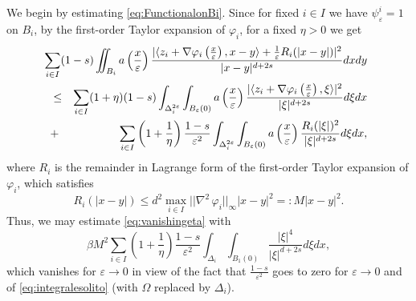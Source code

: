 \documentclass[11pt,a4paper,reqno]{amsart}
\theoremstyle{plain}
\theoremstyle{definition}
\newcommand\e{\varepsilon}
\newcommand\be{\begin{equation}}
\newcommand\ee{\end{equation}}
\newcommand\Omid{\Delta_i^{2\varepsilon}}
\theoremstyle{remark}
\begin{document}
We begin by estimating \eqref{eq:FunctionalonBi}. Since for fixed $i\in I$ we have $\psi_\e^i=1$ on $B_i$, by the first-order Taylor expansion of $\varphi_i$, for a fixed $\eta>0$ we get
\begin{eqnarray}\nonumber
   && \hskip-2.5cm  \sum_{i\in I}(1-s)\iint_{B_i}a\left(\frac{x}{\e}\right)\frac{|\langle z_i + \nabla{\varphi}_i\left(\frac{x}{\e}\right),x-y\rangle+\frac{1}{\e}R_i(|x-y|)\rvert^2}{\lvert x-y\rvert^{d+2s}}dxdy\\ 
   &\leq&\label{eq:nonvanishingeta}  \sum_{i\in I}(1+\eta)(1-s)\int_{\Omid}\int_{B_\e(0)} a\left(\frac{x}{\e}\right)\frac{|\langle z_i + \nabla\varphi_i \left(\frac{x}{\e}\right), \xi \rangle|^2}{|\xi|^{d+2s}} d\xi dx
  \\&+&\label{eq:vanishingeta} \sum_{i\in I}\left(1+\frac{1}{\eta}\right) \frac{1-s}{\e ^2}\int_{\Omid} \int_{B_\e(0)} a\left(\frac{x}{\e}\right) \frac{R_i(|\xi|)^2}{|\xi|^{d+2s}}d\xi dx,
\end{eqnarray}
 where $R_i$ is the remainder in Lagrange form of the first-order Taylor expansion of $\varphi_i$, which satisfies   
\be\label{eq:rest}
R_i(|x-y|)\leq d^2 \max_{i\in I}||\nabla^2\,\varphi_i||_{\infty}|x-y|^2=:M|x-y|^2.
\ee
Thus, we may estimate  \eqref{eq:vanishingeta} with 
\be \nonumber
\beta M^2\sum_{i\in I}\left(1+\frac{1}{\eta}\right) \frac{1-s}{\e ^2}\int_{\Delta_i} \int_{B_1(0)} \frac{|\xi|^4}{|\xi|^{d+2s}}d\xi dx,
\ee
which vanishes for $\e \to 0$ in view of the fact that $\frac{1-s}{\e^2}$ goes to zero for $\e\to0$ and of \eqref{eq:integralesolito} (with $\Omega$ replaced by $\Delta_i$).
\end{document}
